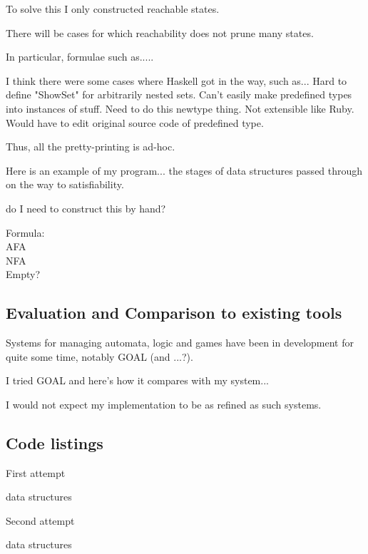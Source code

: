 To solve this I only constructed reachable states.

There will be cases for which reachability does not prune many states.

In particular, formulae such as.....


I think there were some cases where Haskell got in the way, such as...
Hard to define "ShowSet" for arbitrarily nested sets.
Can't easily make predefined types into instances of stuff. Need to do this newtype thing. Not extensible like Ruby. Would have to edit original source code of predefined type.

Thus, all the pretty-printing is ad-hoc.

Here is an example of my program... the stages of data structures passed through on the way to satisfiability.

do I need to construct this by hand?

Formula:
\\AFA
\\NFA
\\Empty?

\subsection{Evaluation and Comparison to existing tools}

Systems for managing automata, logic and games have been in development for quite some time, notably GOAL (and ...?).

I tried GOAL and here's how it compares with my system...

I would not expect my implementation to be as refined as such systems.

\subsection{Code listings}

First attempt


data structures


Second attempt


data structures
